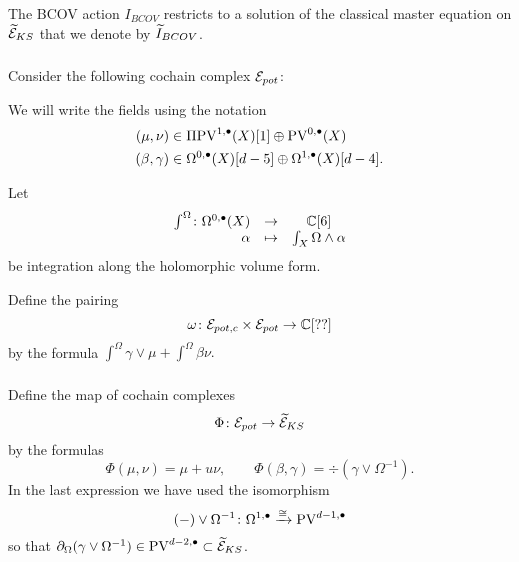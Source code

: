 \documentclass[11pt]{amsart}
\begin{document}
\begin{prop}
\label{prop:tilbcov}
The BCOV action $I_{BCOV}$ restricts to a solution of the classical master equation on $\widetilde{\mathcal E}_{KS}$ that we denote by $\widetilde{I}_{BCOV}$. 
\end{prop}

\subsubsection{}

Consider the following cochain complex $\mathcal E_{pot}$:
\beqn\label{eqn:E}
\eeqn
We will write the fields using the notation
\begin{align*}
(\mu, \nu) & \in \Pi {\rm PV}^{1,\bullet}(X)[1] \oplus {\rm PV}^{0,\bullet}(X) \\
(\beta, \gamma) & \in \Omega^{0,\bullet}(X)[d-5] \oplus \Omega^{1,\bullet}(X) [d-4].
\end{align*}

Let 
\[
\begin{array}{rccc}
\int^\Omega \colon \Omega^{0,\bullet}(X) & \to & \mathbb C [6] \\
\alpha & \mapsto & \int_{X} \Omega \wedge \alpha 
\end{array}
\]
be integration along the holomorphic volume form. 

Define the pairing 
\[
\omega \colon \mathcal E_{pot,c} \times \mathcal E_{pot} \to \mathbb C [??] 
\]
by the formula $\int^\Omega \gamma \vee \mu + \int^\Omega \beta \nu.$


\subsubsection{}

Define the map of cochain complexes
\[
\Phi \colon \mathcal E_{pot} \to \widetilde{\mathcal E}_{KS}
\]
by the formulas
\[
\Phi (\mu,\nu) = \mu + u \nu,\qquad \Phi(\beta, \gamma) = \div \left( \gamma \vee \Omega^{-1} \right)  .
\]
In the last expression we have used the isomorphism
\[
(-) \vee \Omega^{-1} \colon \Omega^{1,\bullet} \xrightarrow{\cong} {\rm PV}^{d-1,\bullet} 
\]
so that $\partial_{\Omega}(\gamma \vee \Omega^{-1}) \in {\rm PV}^{d-2,\bullet} \subset \widetilde{\mathcal E}_{KS}$.
\end{document}
